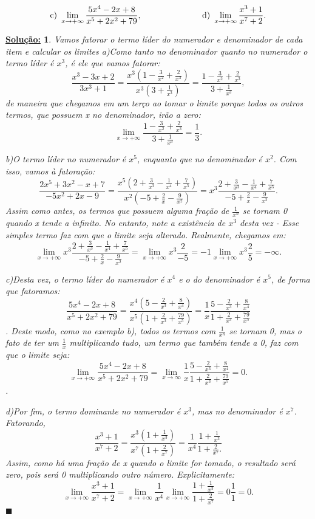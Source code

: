\documentclass{article}
\newtheorem*{sol*}{\underline{Solu\c c\~ao:}}
\renewcommand\qedsymbol{$\blacksquare$}
\begin{document}
$$
	\text{c) }\lim_{x\to+\infty}\frac{5x^4 - 2x + 8}{x^5 + 2x^2 + 79},\hspace{2.5cm}
	\text{d) }\lim_{x\to+\infty}\frac{x^3 + 1}{x^7 + 2}.
$$
\begin{sol*}
	Vamos fatorar o termo l\'ider do numerador e denominador de cada item e calcular os limites
	a)Como tanto no denominador quanto no numerador o termo l\'ider \'e $x^3$, \'e ele que vamos fatorar:
	$$
		\frac{x^3 - 3x + 2}{3x^3 + 1} = \frac{x^3 (1 - \frac{3}{x^2} + \frac{2}{x^3})}{x^3(3 + \frac{1}{x^3})} = \frac{1 - \frac{3}{x^2} + \frac{2}{x^3}}{3 + \frac{1}{x^3}},
	$$
	de maneira que chegamos em um ter\c co ao tomar o limite porque todos os outros termos, que possuem x no denominador, ir\~ao a zero:
	$$
		\lim_{x\to+\infty}\frac{1 - \frac{3}{x^2} + \frac{2}{x^3}}{3 + \frac{1}{x^3}} = \frac{1}{3}.
	$$

	b)O termo l\'ider no numerador \'e $x^5$, enquanto que no denominador \'e $x^2$. Com isso, vamos \`a fatora\c c\~ao:
	$$
		\frac{2x^5 + 3x^2 - x + 7}{-5x^2 + 2x - 9} = \frac{x^5(2 + \frac{3}{x^3} - \frac{1}{x^4} + \frac{7}{x^5})}{x^2(-5 + \frac{2}{x} - \frac{9}{x^2})} = x^3\frac{2 + \frac{3}{x^3} - \frac{1}{x^4} + \frac{7}{x^5}}{-5 + \frac{2}{x} - \frac{9}{x^2}}.
	$$
	Assim como antes, os termos que possuem alguma fra\c c\~ao de $\frac{1}{x^n}$ se tornam 0 quando x tende a infinito. No entanto, note a exist\^encia de $x^3$ desta vez - Esse simples termo faz com que o limite seja alterado. Realmente, chegamos em:
	$$
		\lim_{x\to+\infty}x^3\frac{2 + \frac{3}{x^3} - \frac{1}{x^4} + \frac{7}{x^5}}{-5 + \frac{2}{x} - \frac{9}{x^2}} = \lim_{x\to+\infty}x^3\frac{2}{-5} = -1\lim_{x\to+\infty}x^3\frac{2}{5} = -\infty.
	$$

	c)Desta vez, o termo l\'ider do numerador \'e $x^4$ e o do denominador \'e $x^5$, de forma que fatoramos:
	$$
		\frac{5x^4 - 2x + 8}{x^5 + 2x^2 + 79} = \frac{x^4(5 - \frac{2}{x^3} + \frac{8}{x^4})}{x^5(1 + \frac{2}{x^3} + \frac{79}{x^5})} = \frac{1}{x}\frac{5 - \frac{2}{x^3} + \frac{8}{x^4}}{1 + \frac{2}{x^3} + \frac{79}{x^5}}
	$$.
	Deste modo, como no exemplo b), todos os termos com $\frac{1}{x^n}$ se tornam 0, mas o fato de ter um $\frac{1}{x}$ multiplicando tudo, um termo que tamb\'em tende a 0, faz com que o limite seja:
	$$
		\lim_{x\to+\infty}\frac{5x^4 - 2x + 8}{x^5 + 2x^2 + 79} = \lim_{x\to\infty}\frac{1}{x}\frac{5 - \frac{2}{x^3} + \frac{8}{x^4}}{1 + \frac{2}{x^3} + \frac{79}{x^5}} = 0.
	$$.

	d)Por fim, o termo dominante no numerador \'e $x^3$, mas no denominador \'e $x^7$. Fatorando,
	$$
		\frac{x^3 + 1}{x^7 + 2} = \frac{x^3(1 + \frac{1}{x^3})}{x^7(1 + \frac{2}{x^7})} = \frac{1}{x^4}\frac{1 + \frac{1}{x^3}}{1 + \frac{2}{x^7}.}
	$$
	Assim, como h\'a uma fra\c c\~ao de x quando o limite for tomado, o resultado ser\'a zero, pois ser\'a 0 multiplicando outro n\'umero. Explicitamente:
	$$
		\lim_{x\to+\infty}\frac{x^3 + 1}{x^7 + 2} = \lim_{x\to+\infty}\frac{1}{x^4}\lim_{x\to+\infty}\frac{1 + \frac{1}{x^3}}{1 + \frac{2}{x^7}} = 0\frac{1}{1} = 0.
	$$
	\qedsymbol
\end{sol*}
\end{document}
